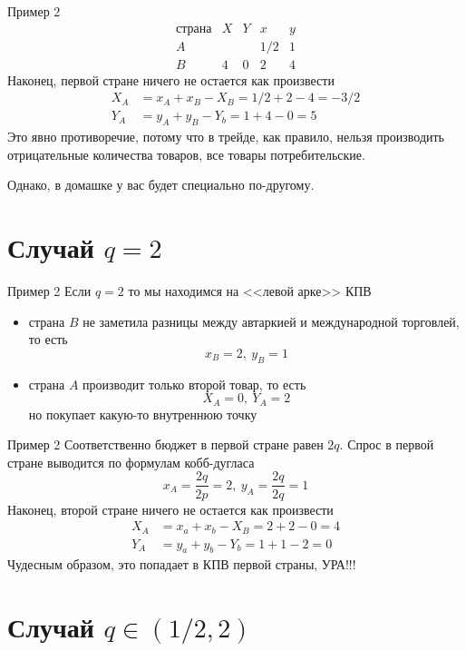 \documentclass{beamer}
\begin{document}
\begin{frame}{Пример 2}
$$\begin{array}{c|c|c|c|c}
  \text{страна} & X & Y & x & y \\
  \hline
  A & & & 1/2 & 1\\
  \hline
  B & 4 & 0 & 2 & 4
\end{array}$$
Наконец, первой стране ничего не остается как произвести
\begin{align*}
	X_A & = x_A + x_B - X_B = 1/2 + 2 - 4 = -3/2\\
	Y_A & = y_A + y_B - Y_b = 1 + 4 - 0 = 5 
\end{align*}
Это явно противоречие, потому что \alert{в трейде, как правило, нельзя производить отрицательные количества товаров}, все товары потребительские. 

Однако, в домашке у вас будет специально по-другому. 
\end{frame}

\section{Случай $q = 2$}

\begin{frame}{Пример 2}
Если $q = 2$ то мы находимся на <<левой арке>> КПВ
\begin{itemize}
  \item страна $B$ не заметила разницы между автаркией и международной торговлей, то есть $$x_B = 2, \ y_B = 1$$
  \item страна $A$ производит только второй товар, то есть
 $$X_A = 0, \ Y_A = 2$$
 но покупает какую-то внутреннюю точку
\end{itemize}
\end{frame}

\begin{frame}{Пример 2}
Соответственно бюджет в первой стране равен $2q$. Спрос в первой стране выводится по формулам кобб-дугласа $$x_A = \frac{2q}{2p} = 2, \ y_A = \frac{2q}{2q} = 1 $$
Наконец, второй стране ничего не остается как произвести
\begin{align*}
	X_A & = x_a + x_b - X_B = 2 + 2 - 0 = 4\\
	Y_A & = y_a + y_b - Y_b = 1 + 1 - 2 = 0 
\end{align*}
Чудесным образом, это попадает в КПВ первой страны, УРА!!!
\end{frame}

\section{Случай $q \in (1/2,2)$}
\end{document}
